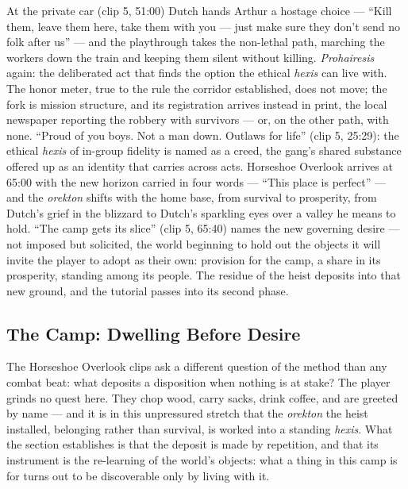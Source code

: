 \documentclass{article}
\begin{document}
At the private car (clip 5, 51:00) Dutch hands Arthur a hostage choice — ``Kill them, leave them here, take them with you — just make sure they don't send no folk after us'' — and the playthrough takes the non-lethal path, marching the workers down the train and keeping them silent without killing. \textit{Prohairesis} again: the deliberated act that finds the option the ethical \textit{hexis} can live with. The honor meter, true to the rule the corridor established, does not move; the fork is mission structure, and its registration arrives instead in print, the local newspaper reporting the robbery with survivors — or, on the other path, with none. ``Proud of you boys. Not a man down. Outlaws for life'' (clip 5, 25:29): the ethical \textit{hexis} of in-group fidelity is named as a creed, the gang's shared substance offered up as an identity that carries across acts. Horseshoe Overlook arrives at 65:00 with the new horizon carried in four words — ``This place is perfect'' — and the \textit{orekton} shifts with the home base, from survival to prosperity, from Dutch's grief in the blizzard to Dutch's sparkling eyes over a valley he means to hold. ``The camp gets its slice'' (clip 5, 65:40) names the new governing desire — not imposed but solicited, the world beginning to hold out the objects it will invite the player to adopt as their own: provision for the camp, a share in its prosperity, standing among its people. The residue of the heist deposits into that new ground, and the tutorial passes into its second phase.

\bigskip

\subsection*{The Camp: Dwelling Before Desire}

The Horseshoe Overlook clips ask a different question of the method than any combat beat: what deposits a disposition when nothing is at stake? The player grinds no quest here. They chop wood, carry sacks, drink coffee, and are greeted by name — and it is in this unpressured stretch that the \textit{orekton} the heist installed, belonging rather than survival, is worked into a standing \textit{hexis}. What the section establishes is that the deposit is made by repetition, and that its instrument is the re-learning of the world's objects: what a thing in this camp is for turns out to be discoverable only by living with it.
\end{document}
